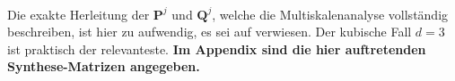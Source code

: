\\
Die exakte Herleitung der $\mathbf{P}^j$ und $\mathbf{Q}^j$, welche die Multiskalenanalyse vollständig beschreiben, ist hier zu aufwendig, es sei auf \cite{finkelstein94} verwiesen. Der kubische Fall $d=3$ ist praktisch der relevanteste. \textbf{Im Appendix sind die hier auftretenden Synthese-Matrizen angegeben.}
%
%
